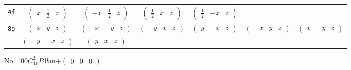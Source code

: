 \documentclass[fleqn,9pt,landscape]{jsarticle}
\begin{document}
\begin{center}
\begin{longtable}{ccccccc}
{\tt 4f} & $ \begin{pmatrix} x & \frac{1}{2} & z \end{pmatrix} $ & $ \begin{pmatrix} - x & \frac{1}{2} & z \end{pmatrix} $ & $ \begin{pmatrix} \frac{1}{2} & x & z \end{pmatrix} $ & $ \begin{pmatrix} \frac{1}{2} & - x & z \end{pmatrix} $ & $  $ & $  $ \\ \hline
{\tt 8g} & $ \begin{pmatrix} x & y & z \end{pmatrix} $ & $ \begin{pmatrix} - x & - y & z \end{pmatrix} $ & $ \begin{pmatrix} - y & x & z \end{pmatrix} $ & $ \begin{pmatrix} y & - x & z \end{pmatrix} $ & $ \begin{pmatrix} - x & y & z \end{pmatrix} $ & $ \begin{pmatrix} x & - y & z \end{pmatrix} $ \\
& $ \begin{pmatrix} - y & - x & z \end{pmatrix} $ & $ \begin{pmatrix} y & x & z \end{pmatrix} $ & $  $ & $  $ & $  $ & $  $ \\
\end{longtable}
\end{center}
\newpage
No. 100\quad$C_{4v}^{2}$\quad$P4bm$\quad[ tetragonal ]\quad$+\begin{pmatrix} 0 & 0 & 0 \end{pmatrix}$
\end{document}

